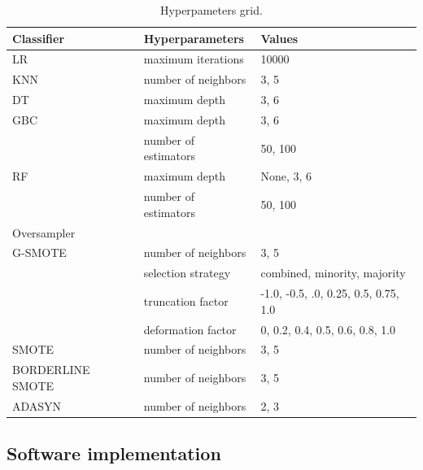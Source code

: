 \documentclass[remotesensing,article,submit,moreauthors,pdftex]{Definitions/mdpi}
\begin{document}
\begin{table}[H]
	\centering
	\begin{tabular}{lll}
		\toprule
		Classifier       & Hyperparameters      & Values                       \\
		\hline
		LR               & maximum iterations   & 10000                        \\
		KNN              & number of neighbors  & {3, 5}                       \\
		DT               & maximum depth        & {3, 6}                       \\
		GBC              & maximum depth        & {3, 6}                       \\
		                 & number of estimators & {50, 100}                    \\
		RF               & maximum depth        & {None, 3, 6}                 \\
		                 & number of estimators & {50, 100}                    \\
		\toprule
		Oversampler      &                      &                              \\
		\hline
		G-SMOTE          & number of neighbors  & {3, 5}                       \\
		                 & selection strategy   & combined, minority, majority \\
		                 & truncation factor    & {-1.0, -0.5, .0, 0.25, 0.5,
				0.75, 1.0}                                                             \\
		                 & deformation factor   & {0, 0.2, 0.4, 0.5, 0.6, 0.8,
				1.0}                                                                   \\
		SMOTE            & number of neighbors  & {3, 5}                       \\
		BORDERLINE SMOTE & number of neighbors  & {3, 5}                       \\
		ADASYN           & number of neighbors  & {2, 3}                       \\
		\bottomrule
	\end{tabular}
	\caption{\label{tab:grid}Hyperpameters grid.}
\end{table}

\subsection{Software implementation}
\end{document}
